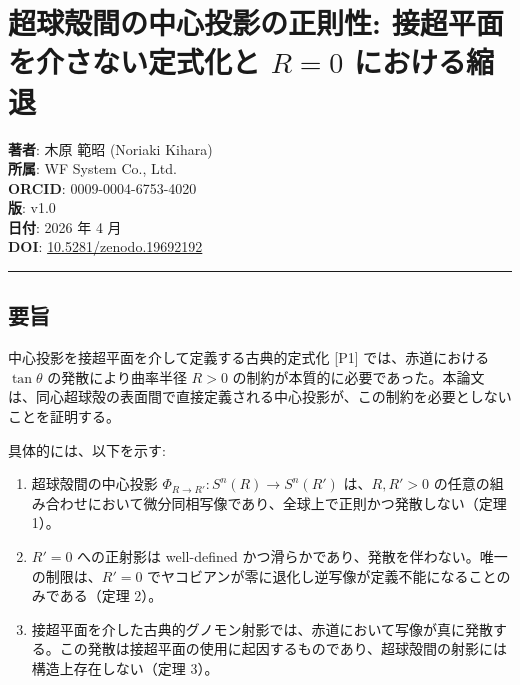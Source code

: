 \documentclass[
  a4paper]{ltjsarticle}
\author{}
\date{}
\providecommand{\tightlist}{%
  \setlength{\itemsep}{0pt}\setlength{\parskip}{0pt}}
\begin{document}
\section{\texorpdfstring{超球殻間の中心投影の正則性:
接超平面を介さない定式化と \(R = 0\)
における縮退}{超球殻間の中心投影の正則性: 接超平面を介さない定式化と R = 0 における縮退}}\label{ux8d85ux7403ux6bbbux9593ux306eux4e2dux5fc3ux6295ux5f71ux306eux6b63ux5247ux6027-ux63a5ux8d85ux5e73ux9762ux3092ux4ecbux3055ux306aux3044ux5b9aux5f0fux5316ux3068-r-0-ux306bux304aux3051ux308bux7e2eux9000}

\textbf{著者}: 木原 範昭 (Noriaki Kihara)\\
\textbf{所属}: WF System Co., Ltd.\\
\textbf{ORCID}: 0009-0004-6753-4020\\
\textbf{版}: v1.0\\
\textbf{日付}: 2026 年 4 月\\
\textbf{DOI}:
\href{https://doi.org/10.5281/zenodo.19692192}{10.5281/zenodo.19692192}

\begin{center}\rule{0.5\linewidth}{0.5pt}\end{center}

\subsection{要旨}\label{ux8981ux65e8}

中心投影を接超平面を介して定義する古典的定式化 {[}P1{]}
では、赤道における \(\tan\theta\) の発散により曲率半径 \(R > 0\)
の制約が本質的に必要であった。本論文は、同心超球殻の表面間で直接定義される中心投影が、この制約を必要としないことを証明する。

具体的には、以下を示す:

\begin{enumerate}
\def\labelenumi{\arabic{enumi}.}
\tightlist
\item
  超球殻間の中心投影 \(\Phi_{R \to R'} : S^n(R) \to S^n(R')\)
  は、\(R, R' > 0\)
  の任意の組み合わせにおいて微分同相写像であり、全球上で正則かつ発散しない（定理
  1）。
\item
  \(R' = 0\) への正射影は well-defined
  かつ滑らかであり、発散を伴わない。唯一の制限は、\(R' = 0\)
  でヤコビアンが零に退化し逆写像が定義不能になることのみである（定理
  2）。
\item
  接超平面を介した古典的グノモン射影では、赤道において写像が真に発散する。この発散は接超平面の使用に起因するものであり、超球殻間の射影には構造上存在しない（定理
  3）。
\end{enumerate}
\end{document}

